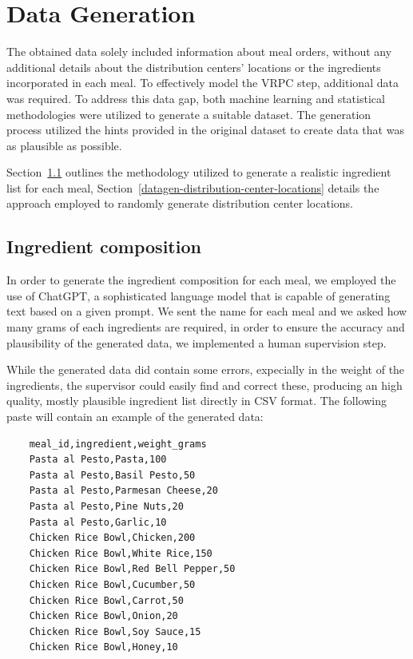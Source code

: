 \chapter{Data Generation}
\label{data-generation}

The obtained data solely included information about meal orders, without any additional details about the distribution centers' locations or the ingredients incorporated in each meal. To effectively model the VRPC step, additional data was required. To address this data gap, both machine learning and statistical methodologies were utilized to generate a suitable dataset. The generation process utilized the hints provided in the original dataset to create data that was as plausible as possible.

Section~\ref{datagen-ingredient-composition} outlines the methodology utilized to generate a realistic ingredient list for each meal,
Section~\ref{datagen-distribution-center-locations} details the approach employed to randomly generate distribution center locations.

\section{Ingredient composition}
\label{datagen-ingredient-composition}
In order to generate the ingredient composition for each meal, we employed the use of ChatGPT, a sophisticated language model that is capable of generating text based on a given prompt. We sent the name for each meal and we asked how many grams of each ingredients are required, in order to ensure the accuracy and plausibility of the generated data, we implemented a human supervision step.

While the generated data did contain some errors, expecially in the weight of the ingredients, the supervisor could easily find and correct these, producing an high quality, mostly plausible ingredient list directly in CSV format. The following paste will contain an example of the generated data:


\begin{verbatim}
    meal_id,ingredient,weight_grams
    Pasta al Pesto,Pasta,100
    Pasta al Pesto,Basil Pesto,50
    Pasta al Pesto,Parmesan Cheese,20
    Pasta al Pesto,Pine Nuts,20
    Pasta al Pesto,Garlic,10
    Chicken Rice Bowl,Chicken,200
    Chicken Rice Bowl,White Rice,150
    Chicken Rice Bowl,Red Bell Pepper,50
    Chicken Rice Bowl,Cucumber,50
    Chicken Rice Bowl,Carrot,50
    Chicken Rice Bowl,Onion,20
    Chicken Rice Bowl,Soy Sauce,15
    Chicken Rice Bowl,Honey,10
\end{verbatim}

